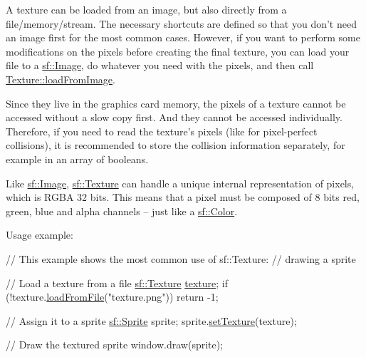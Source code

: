 A texture can be loaded from an image, but also directly from a file/memory/stream. The necessary shortcuts are defined so that you don't need an image first for the most common cases. However, if you want to perform some modifications on the pixels before creating the final texture, you can load your file to a \hyperlink{classsf_1_1_image}{sf\-::\-Image}, do whatever you need with the pixels, and then call \hyperlink{classsf_1_1_texture_abec4567ad9856a3596dc74803f26fba2}{Texture\-::load\-From\-Image}.

Since they live in the graphics card memory, the pixels of a texture cannot be accessed without a slow copy first. And they cannot be accessed individually. Therefore, if you need to read the texture's pixels (like for pixel-\/perfect collisions), it is recommended to store the collision information separately, for example in an array of booleans.

Like \hyperlink{classsf_1_1_image}{sf\-::\-Image}, \hyperlink{classsf_1_1_texture}{sf\-::\-Texture} can handle a unique internal representation of pixels, which is R\-G\-B\-A 32 bits. This means that a pixel must be composed of 8 bits red, green, blue and alpha channels -- just like a \hyperlink{classsf_1_1_color}{sf\-::\-Color}.

Usage example\-: 
\begin{DoxyCode}
\textcolor{comment}{// This example shows the most common use of sf::Texture:}
\textcolor{comment}{// drawing a sprite}

\textcolor{comment}{// Load a texture from a file}
\hyperlink{classsf_1_1_texture}{sf::Texture} \hyperlink{gl3_8h_ab21590c4736d1459a5a0674a42b5a655}{texture};
\textcolor{keywordflow}{if} (!texture.\hyperlink{classsf_1_1_texture_a8e1b56eabfe33e2e0e1cb03712c7fcc7}{loadFromFile}(\textcolor{stringliteral}{"texture.png"}))
    \textcolor{keywordflow}{return} -1;

\textcolor{comment}{// Assign it to a sprite}
\hyperlink{classsf_1_1_sprite}{sf::Sprite} sprite;
sprite.\hyperlink{classsf_1_1_sprite_a3729c88d88ac38c19317c18e87242560}{setTexture}(texture);

\textcolor{comment}{// Draw the textured sprite}
window.draw(sprite);
\end{DoxyCode}



